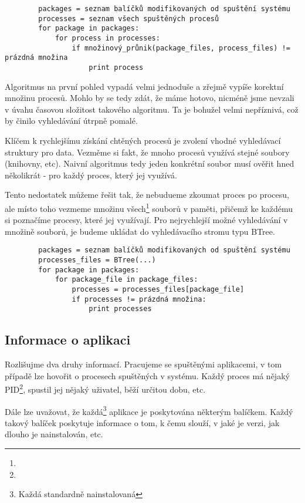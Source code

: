 \documentclass[10pt,a4paper]{article}
\begin{document}
		\begin{verbatim}
		packages = seznam balíčků modifikovaných od spuštění systému
		processes = seznam všech spuštěných procesů
		for package in packages:
		    for process in processes:
		        if množinový_průnik(package_files, process_files) != prázdná množina
		            print process
		\end{verbatim}
		
		Algoritmus na první pohled vypadá velmi jednoduše a zřejmě vypíše korektní množinu procesů. Mohlo by se tedy zdát, že máme hotovo, nicméně jsme nevzali v úvahu časovou složitost takového algoritmu. Ta je bohužel velmi nepříznivá, což by činilo vyhledávání útrpně pomalé.
		
		
		Klíčem k rychlejšímu získání chtěných procesů je zvolení vhodné vyhledávací struktury pro data. Vezměme si fakt, že mnoho procesů využívá stejné soubory (knihovny, etc). Naivní algoritmus tedy jeden konkrétní soubor musí ověřit hned několikrát - pro každý proces, který jej využívá.
		
		Tento nedostatek můžeme řešit tak, že nebudueme zkoumat proces po procesu, ale místo toho vezmeme množinu všech\footnote{} souborů v paměti, přičemž ke každému si poznačíme procesy, které jej využívají. Pro nejrychlejší možné vyhledávání v množině souborů, je budeme ukládat do vyhledávacího stromu typu BTree.
		
		\begin{verbatim}
		packages = seznam balíčků modifikovaných od spuštění systému
		processes_files = BTree(...)
		for package in packages:
		    for package_file in package_files:
		        processes = processes_files[package_file]
		        if processes != prázdná množina:
		            print processes
		\end{verbatim}
		
		
		\subsection{Informace o aplikaci}
		Rozlišujme dva druhy informací. Pracujeme se spuštěnými aplikacemi, v tom případě lze hovořit o procesech spuštěných v systému. Každý proces má nějaký PID\footnote{}, spustil jej nějaký uživatel, běží určitou dobu, etc.
		
		Dále lze uvažovat, že každá\footnote{Každá standardně nainstalovaná} aplikace je poskytována některým balíčkem. Každý takový balíček poskytuje informace o tom, k čemu slouží, v jaké je verzi, jak dlouho je nainstalován, etc.
		
\end{document}
